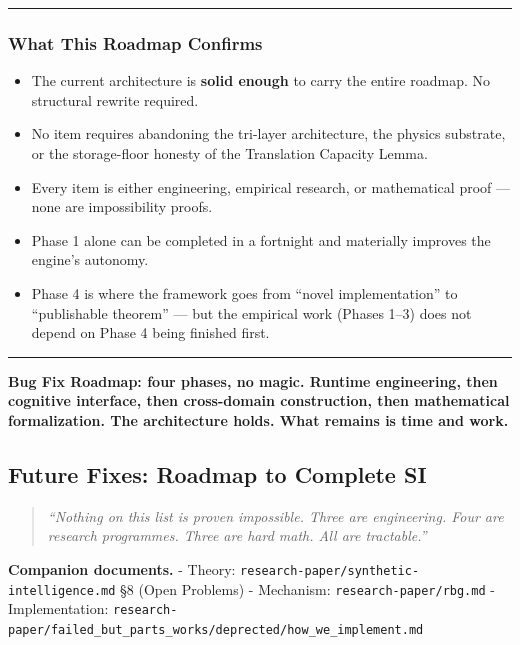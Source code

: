 \documentclass[
  11pt,
  a4paper,
]{article}
\providecommand{\tightlist}{%
  \setlength{\itemsep}{0pt}\setlength{\parskip}{0pt}}
\begin{document}
\begin{center}\rule{0.5\linewidth}{0.5pt}\end{center}

\subsubsection{What This Roadmap
Confirms}\label{what-this-roadmap-confirms}

\begin{itemize}
\tightlist
\item
  The current architecture is \textbf{solid enough} to carry the entire
  roadmap. No structural rewrite required.
\item
  No item requires abandoning the tri-layer architecture, the physics
  substrate, or the storage-floor honesty of the Translation Capacity
  Lemma.
\item
  Every item is either engineering, empirical research, or mathematical
  proof --- none are impossibility proofs.
\item
  Phase 1 alone can be completed in a fortnight and materially improves
  the engine's autonomy.
\item
  Phase 4 is where the framework goes from ``novel implementation'' to
  ``publishable theorem'' --- but the empirical work (Phases 1--3) does
  not depend on Phase 4 being finished first.
\end{itemize}

\begin{center}\rule{0.5\linewidth}{0.5pt}\end{center}

\textbf{Bug Fix Roadmap: four phases, no magic. Runtime engineering,
then cognitive interface, then cross-domain construction, then
mathematical formalization. The architecture holds. What remains is time
and work.}

\newpage

\subsection{Future Fixes: Roadmap to Complete
SI}\label{future-fixes-roadmap-to-complete-si}

\begin{quote}
\emph{``Nothing on this list is proven impossible. Three are
engineering. Four are research programmes. Three are hard math. All are
tractable.''}
\end{quote}

\textbf{Companion documents.} - Theory:
\texttt{research-paper/synthetic-intelligence.md} §8 (Open Problems) -
Mechanism: \texttt{research-paper/rbg.md} - Implementation:
\texttt{research-paper/failed\_but\_parts\_works/deprected/how\_we\_implement.md}
\end{document}
